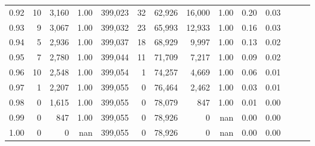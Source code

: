 \begin{tabular}{rrrrrrrrrrrrrr}
0.92 &     10 &  3,160 &  1.00 &  399,023 &       32 &  62,926 &  16,000 &  1.00 &  0.20 &      0.03 \\
0.93 &      9 &  3,067 &  1.00 &  399,032 &       23 &  65,993 &  12,933 &  1.00 &  0.16 &      0.03 \\
0.94 &      5 &  2,936 &  1.00 &  399,037 &       18 &  68,929 &   9,997 &  1.00 &  0.13 &      0.02 \\
0.95 &      7 &  2,780 &  1.00 &  399,044 &       11 &  71,709 &   7,217 &  1.00 &  0.09 &      0.02 \\
0.96 &     10 &  2,548 &  1.00 &  399,054 &        1 &  74,257 &   4,669 &  1.00 &  0.06 &      0.01 \\
0.97 &      1 &  2,207 &  1.00 &  399,055 &        0 &  76,464 &   2,462 &  1.00 &  0.03 &      0.01 \\
0.98 &      0 &  1,615 &  1.00 &  399,055 &        0 &  78,079 &     847 &  1.00 &  0.01 &      0.00 \\
0.99 &      0 &    847 &  1.00 &  399,055 &        0 &  78,926 &       0 &   nan &  0.00 &      0.00 \\
1.00 &      0 &      0 &   nan &  399,055 &        0 &  78,926 &       0 &   nan &  0.00 &      0.00 \\
\bottomrule
\end{tabular}
